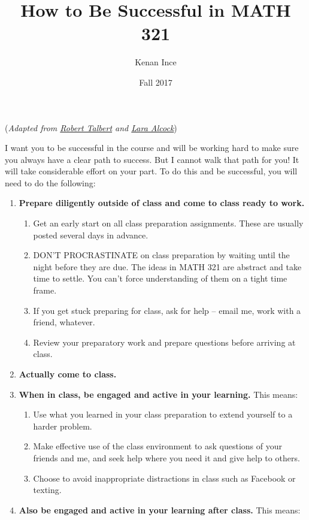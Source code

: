 \documentclass[12pt]{article}
\title{How to Be Successful in MATH 321}
\author{Kenan Ince}
\date{Fall 2017}                         %
\begin{document}
\maketitle

(\textit{Adapted from \href{https://docs.google.com/document/d/1NeRgy4sWs7ZPfCK7kTCBqNOhEy-0lMbRIO0A5jwdyNI/edit}{Robert Talbert} and \href{https://www.amazon.com/Think-About-Analysis-Lara-Alcock/dp/0198723539}{Lara Alcock}})

I want you to be successful in the course and will be working hard to make sure you always have a clear path to success. But I cannot walk that path for you! It will take considerable effort on your part. To do this and be successful, you will need to do the following: 

\begin{enumerate} 
\item \textbf{Prepare diligently outside of class and come to class ready to work.}
	\begin{enumerate}
	\item Get an early start on all class preparation assignments. These are usually posted several days in advance. 
	\item DON'T PROCRASTINATE on class preparation by waiting until the night before they are due. The ideas in MATH 321 are abstract and take time to settle. You can't force understanding of them on a tight time frame. 
	\item If you get stuck preparing for class, ask for help -- email me, work with a friend, whatever. 
	\item Review your preparatory work and prepare questions before arriving at class. 
	\end{enumerate}
\item \textbf{Actually come to class.}
\item \textbf{When in class, be engaged and active in your learning.} This means: 
	\begin{enumerate}
	\item Use what you learned in your class preparation to extend yourself to a harder problem. 
	\item Make effective use of the class environment to ask questions of your friends and me, and seek help where you need it and give help to others. 
	\item Choose to avoid inappropriate distractions in class such as Facebook or texting. 
	\end{enumerate}
\item \textbf{Also be engaged and active in your learning after class.} This means: 

\end{enumerate}
\end{document}
